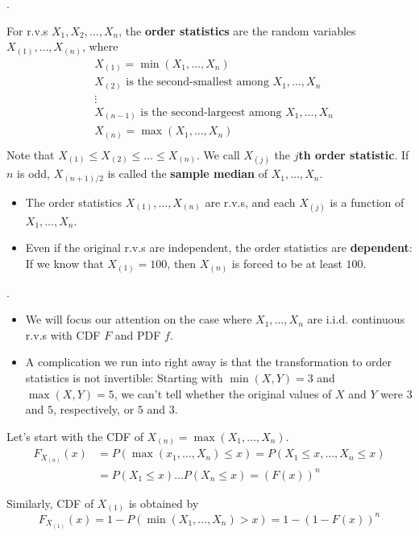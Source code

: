 \documentclass[8pt]{beamer}
\newcommand{\tb}[1]{\textbf{#1}}
\begin{document}
\begin{frame}{.}

    \begin{definition}
        For r.v.s $X_1, X_2, \dots, X_n$, the \tb{order statistics} are the random variables $X_{(1)}, \dots, X_{(n)}$, where
        \[
            \begin{aligned}
                &X_{(1)} = \min (X_1, \dots, X_n) \\
                &X_{(2)} \text{ is the second-smallest among } X_1, \dots, X_n \\
                &\vdots \\
                &X_{(n-1)} \text{ is the second-largeest among } X_1, \dots, X_n \\
                &X_{(n)} = \max (X_1, \dots, X_n) \\
            \end{aligned}
        \]
        Note that $X_{(1)}\leq X_{(2)} \leq \dots \leq X_{(n)}$. We call $X_{(j)}$ the \tb{$j$th order statistic}. If $n$ is odd, $X_{(n+1)/2}$ is called the \tb{sample median} of $X_1, \dots, X_n$.
    
    \end{definition}

    \begin{itemize}
        \item The order statistics $X_{(1)}, \dots, X_{(n)}$ are r.v.s, and each $X_{(j)}$ is a function of $X_1, \dots, X_n$. 
        \item Even if the original r.v.s are independent, the order statistics are \tb{dependent}: If we know that $X_{(1)}=100$, then $X_{(n)}$ is forced to be at least $100$.
    \end{itemize}
\end{frame}

\begin{frame}{.}
    \begin{itemize}
        \item We will focus our attention on the case where $X_1, \dots, X_n$ are i.i.d. continuous r.v.s with CDF $F$ and PDF $f$.
        \item A complication we run into right away is that the transformation to order statistics is not invertible: Starting with $\min(X,Y)=3$ and $\max (X,Y)=5$, we can't tell whether the original values of $X$ and $Y$ were $3$ and $5$, respectively, or $5$ and $3$.
    \end{itemize}

    Let's start with the CDF of $X_{(n)} = \max(X_1, \dots, X_n)$.
    \[
    \begin{aligned}
        F_{X_{(n)}}(x) &= P(\max(x_1, \dots, X_n) \leq x) = P(X_1 \leq x, \dots, X_n \leq x) \\
        &= P(X_1 \leq x) \dots P(X_n \leq x) = (F(x))^n
    \end{aligned}
    \]
    
    Similarly, CDF of $X_{(1)}$ is obtained by 
    \[
        F_{X_{(1)}}(x) = 1- P(\min(X_1, \dots, X_n) > x) = 1- (1-F(x))^n
    \]
\end{frame}
\end{document}
